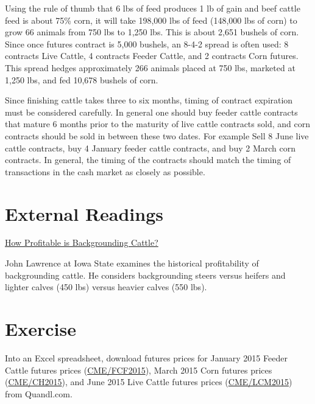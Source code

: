 \documentclass[]{book}
\theoremstyle{definition}
\theoremstyle{definition}
\theoremstyle{remark}
\begin{document}
Using the rule of thumb that 6 lbs of feed produces 1 lb of gain and
beef cattle feed is about 75\% corn, it will take 198,000 lbs of feed
(148,000 lbs of corn) to grow 66 animals from 750 lbs to 1,250 lbs. This
is about 2,651 bushels of corn. Since once futures contract is 5,000
bushels, an 8-4-2 spread is often used: 8 contracts Live Cattle, 4
contracts Feeder Cattle, and 2 contracts Corn futures. This spread
hedges approximately 266 animals placed at 750 lbs, marketed at 1,250
lbs, and fed 10,678 bushels of corn.

Since finishing cattle takes three to six months, timing of contract
expiration must be considered carefully. In general one should buy
feeder cattle contracts that mature 6 months prior to the maturity of
live cattle contracts sold, and corn contracts should be sold in between
these two dates. For example Sell 8 June live cattle contracts, buy 4
January feeder cattle contracts, and buy 2 March corn contracts. In
general, the timing of the contracts should match the timing of
transactions in the cash market as closely as possible.

\section{External Readings}\label{external-readings}

\href{http://www2.econ.iastate.edu/faculty/lawrence/Acrobat/Backgrounding\%20Cattle.pdf}{How
Profitable is Backgrounding Cattle?}

John Lawrence at Iowa State examines the historical profitability of
backgrounding cattle. He considers backgrounding steers versus heifers
and lighter calves (450 lbs) versus heavier calves (550 lbs).

\section{Exercise}\label{exercise}

Into an Excel spreadsheet, download futures prices for January 2015
Feeder Cattle futures prices
(\href{https://www.quandl.com/data/CME/FCF2015-Feeder-Cattle-Futures-January-2015-FCF2015}{CME/FCF2015}),
March 2015 Corn futures prices
(\href{https://www.quandl.com/data/CME/CH2015-Corn-Futures-March-2015-CH2015}{CME/CH2015}),
and June 2015 Live Cattle futures prices
(\href{https://www.quandl.com/data/CME/LCM2015-Live-Cattle-Futures-June-2015-LCM2015}{CME/LCM2015})
from Quandl.com.
\end{document}
